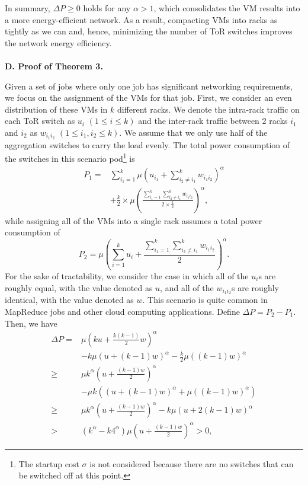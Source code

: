 \documentclass[journal,single-space,two column,twoside,10pt]{IEEEtran}
\begin{document}
In summary, $\Delta P \geq 0$ holds for any $\alpha > 1$, which consolidates the VM results into a more energy-efficient network.
As a result, compacting VMs into racks as tightly as we can and, hence, minimizing the number of ToR switches improves the network energy efficiency. 
\\\\
\noindent\textbf{D. Proof of Theorem 3.}

Given a set of jobs where only one job has significant networking requirements, we focus on the assignment of the VMs for that job. First, we consider an even distribution of these VMs in $k$ different racks. We denote the intra-rack traffic on each ToR switch as $u_i$ $(1 \leq i \leq k)$ and the inter-rack traffic between $2$ racks $i_1$ and $i_2$ as $w_{i_1i_2}$ $(1 \leq i_1, i_2 \leq k)$. We assume that we only use half of the aggregation switches to carry the load evenly.
The total power consumption of the switches in this scenario pod\footnote{The startup cost $\sigma$ is not considered because there are no switches that can be switched off at this point.} is
\begin{equation}
\begin{aligned}
P_1 =& \sum_{i_1=1}^k \mu \left( u_{i_1} + \sum_{i_2 \neq i_1}^k w_{i_1 i_2} \right)^{\alpha} \\
&+ \frac{k}{2} \times \mu \left( \frac{\sum_{i_1=1}^k\sum_{i_2 \neq i_1}^k w_{i_1 i_2}}{2 \times \frac{k}{2}} \right)^{\alpha},
\end{aligned}
\end{equation}
while assigning all of the VMs into a single rack assumes a total power consumption of
\begin{equation}
P_2 = \mu \left( \sum_{i=1}^k u_{i} + \frac{\sum_{i_1=1}^k \sum_{i_2 \neq i_1}^k w_{i_1 i_2}}{2} \right)^{\alpha}. 
\end{equation}
For the sake of tractability, we consider the case in which all of the $u_i$s are roughly equal, with the value denoted as $u$, and all of the $w_{i_1 i_2}$s are roughly identical, with the value denoted as $w$. This scenario is quite common in MapReduce jobs and other cloud computing applications. Define $\Delta P = P_2 - P_1$. Then, we have
\begin{equation}
\begin{aligned}
	\Delta P = 	& \mu \left( ku + \frac{k(k-1)}{2}w \right)^{\alpha} \\
			 &- k \mu \left( u + (k-1)w \right)^{\alpha} - \frac{k}{2} \mu \left( (k-1)w \right)^{\alpha} \\
		\geq	& \mu k^{\alpha} \left( u + \frac{(k-1)w}{2} \right)^{\alpha} \\
			 &- \mu k\left( \left( u + (k-1)w \right)^{\alpha} + \mu \left( (k-1)w \right)^{\alpha} \right) \\
		\geq  & \mu k^{\alpha} \left( u + \frac{(k-1)w}{2} \right)^{\alpha} - k \mu \left( u + 2(k-1)w \right)^{\alpha}\\
		>  & (k^{\alpha} - k4^{\alpha})  \mu \left( u + \frac{(k-1)w}{2} \right)^{\alpha}
		>   0,
\end{aligned}
\end{equation}
\end{document}
